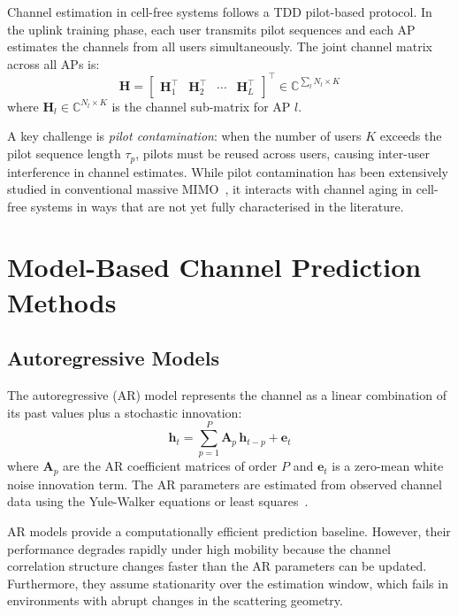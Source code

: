 \documentclass[12pt,a4paper]{article}
\newcommand{\bH}{\mathbf{H}}
\newcommand{\bh}{\mathbf{h}}
\newcommand{\CC}{\mathbb{C}}
\newcommand{\bA}{\mathbf{A}}
\begin{document}
Channel estimation in cell-free systems follows a TDD pilot-based
protocol. In the uplink training phase, each user transmits pilot
sequences and each AP estimates the channels from all users
simultaneously. The joint channel matrix across all APs is:
\begin{equation}
  \bH = \begin{bmatrix} \bH_1^\top & \bH_2^\top & \cdots & \bH_L^\top \end{bmatrix}^\top
  \in \CC^{\sum_l N_l \times K}
\end{equation}
where $\bH_l \in \CC^{N_l \times K}$ is the channel sub-matrix for
AP $l$.

A key challenge is \textit{pilot contamination}: when the number of
users $K$ exceeds the pilot sequence length $\tau_p$, pilots must be
reused across users, causing inter-user interference in channel
estimates. While pilot contamination has been extensively studied in
conventional massive MIMO~\cite{Guo2024joint}, it interacts with
channel aging in cell-free systems in ways that are not yet fully
characterised in the literature.

\section{Model-Based Channel Prediction Methods}

\subsection{Autoregressive Models}

The autoregressive (AR) model represents the channel as a linear
combination of its past values plus a stochastic innovation:
\begin{equation}
  \bh_t = \sum_{p=1}^{P} \bA_p\, \bh_{t-p} + \mathbf{e}_t
\end{equation}
where $\bA_p$ are the AR coefficient matrices of order $P$ and
$\mathbf{e}_t$ is a zero-mean white noise innovation term. The AR
parameters are estimated from observed channel data using the
Yule-Walker equations or least squares~\cite{Kim2021kalman}.

AR models provide a computationally efficient prediction baseline.
However, their performance degrades rapidly under high mobility because
the channel correlation structure changes faster than the AR parameters
can be updated. Furthermore, they assume stationarity over the
estimation window, which fails in environments with abrupt changes in
the scattering geometry.
\end{document}
